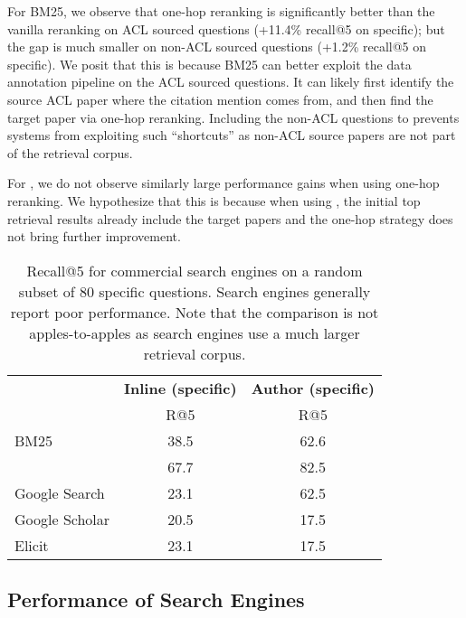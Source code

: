 For BM25, we observe that one-hop reranking is significantly better than the vanilla reranking on ACL sourced questions (+11.4\% recall@5 on specific); but the gap is much smaller on non-ACL sourced questions (+1.2\% recall@5 on specific). 
We posit that this is because BM25 can better exploit the data annotation pipeline on the ACL sourced questions. It can likely first identify the source ACL paper where the citation mention comes from, and then find the target paper via one-hop reranking. Including the non-ACL questions to \ours{} prevents systems from exploiting such ``shortcuts'' as non-ACL source papers are not part of the retrieval corpus. 

For \grit{}, we do not observe similarly large performance gains when using one-hop reranking. We hypothesize that this is because when using \grit{}, the initial top retrieval results already include the target papers and the one-hop strategy does not bring further improvement.

\begin{table}[t]
    \centering
    \small
        \begin{tabular}{lcc}
            \toprule
            & \multicolumn{1}{c}{\textbf{Inline (specific)}} & \multicolumn{1}{c}{\textbf{Author (specific)}} \\
            & R@5 & R@5 \\
            \midrule
            BM25  & 38.5 & 62.6 \\
            \gritfull{} & 67.7 & 82.5 \\ \midrule
            Google Search& 23.1 & 62.5\\
            Google Scholar & 20.5 & 17.5 \\
            Elicit & 23.1 & 17.5 \\
            \bottomrule
       \end{tabular}
    \caption{Recall@5 for commercial search engines on a random subset of 80 specific questions. Search engines generally report poor performance. Note that the comparison is not apples-to-apples as search engines use a much larger retrieval corpus.}
    \label{table:search_engines}
\end{table}

\subsection{Performance of Search Engines}
\label{sec:search_engines}

